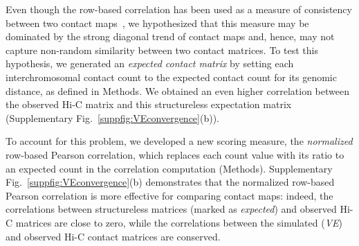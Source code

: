 Even though the row-based correlation has been used as a measure of
consistency between two contact maps~\cite{tjong:physical,
  imakaev:iterative}, we hypothesized that this measure may be
dominated by the strong diagonal trend of contact maps and, hence, may
not capture non-random similarity between two contact matrices.  To
test this hypothesis, we generated an {\em expected contact matrix} by
setting each interchromosomal contact count to the expected contact count
for its genomic distance, as defined in Methods.
We obtained an even higher correlation between the observed
Hi-C matrix and this structureless expectation matrix (Supplementary
Fig.~\ref{suppfig:VEconvergence}(b)).

To account for this problem, we developed a new scoring measure, the
\emph{normalized} row-based Pearson correlation, which replaces each
count value with its ratio to an expected count in the correlation
computation (Methods).  Supplementary
Fig.~\ref{suppfig:VEconvergence}(b) demonstrates that the normalized
row-based Pearson correlation is more effective for comparing contact
maps: indeed, the correlations between structureless matrices (marked
as \textit{expected}) and observed Hi-C matrices are close to zero,
while the correlations between the simulated (\textit{VE}) and
observed Hi-C contact matrices are conserved.

